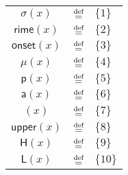 \begin{figure}[ht]
\begin{minipage}[t]{0.6\textwidth}
\begin{tabular}{ccl}
		\hline
		$\mathsf{\sigma}(x)$ & $\stackrel{\text{def}}{=}$ &  $\{1\}$ \\
		$\mathsf{rime}(x)$ & $\stackrel{\text{def}}{=}$ &  $\{2\}$ \\
		$\mathsf{onset}(x)$ & $\stackrel{\text{def}}{=}$ &  $\{3\}$ \\
		$\mu(x)$ & $\stackrel{\text{def}}{=}$ & $ \{4\}$ \\
		\hline
		$\mathsf{p}(x)$ & $\stackrel{\text{def}}{=}$ & $\{5\}$\\
		${\mathsf{a}}(x)$ & $\stackrel{\text{def}}{=}$ & $\{6\}$ \\
		\textglotstop$(x)$ & $\stackrel{\text{def}}{=}$ & $\{7\}$ \\
		${\mathsf{upper}}(x)$ & $\stackrel{\text{def}}{=}$ & $\{8\}$\\
		${\mathsf{H}}(x)$ & $\stackrel{\text{def}}{=}$ & $\{9\}$ \\
		${\mathsf{L}}(x)$ & $\stackrel{\text{def}}{=}$ & $\{10\}$ \\
		\hline
	\end{tabular}
\end{minipage}
\end{figure}



